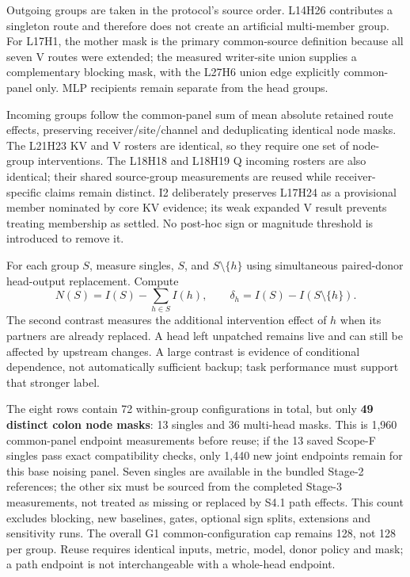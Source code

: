 \documentclass[11pt,a4paper]{article}
\begin{document}
Outgoing groups are taken in the protocol's source order. L14H26 contributes a singleton route and therefore does not create an artificial multi-member group. For L17H1, the mother mask is the primary common-source definition because all seven V routes were extended; the measured writer-site union supplies a complementary blocking mask, with the L27H6 union edge explicitly common-panel only. MLP recipients remain separate from the head groups.

Incoming groups follow the common-panel sum of mean absolute retained route effects, preserving receiver/site/channel and deduplicating identical node masks. The L21H23 KV and V rosters are identical, so they require one set of node-group interventions. The L18H18 and L18H19 Q incoming rosters are also identical; their shared source-group measurements are reused while receiver-specific claims remain distinct. I2 deliberately preserves L17H24 as a provisional member nominated by core KV evidence; its weak expanded V result prevents treating membership as settled. No post-hoc sign or magnitude threshold is introduced to remove it.

For each group $S$, measure singles, $S$, and $S\setminus\{h\}$ using simultaneous paired-donor head-output replacement. Compute
\[
 N(S)=I(S)-\sum_{h\in S}I(h),\qquad
 \delta_h=I(S)-I(S\setminus\{h\}).
\]
The second contrast measures the additional intervention effect of $h$ when its partners are already replaced. A head left unpatched remains live and can still be affected by upstream changes. A large contrast is evidence of conditional dependence, not automatically sufficient backup; task performance must support that stronger label.

The eight rows contain 72 within-group configurations in total, but only \textbf{49 distinct colon node masks}: 13 singles and 36 multi-head masks. This is 1,960 common-panel endpoint measurements before reuse; if the 13 saved Scope-F singles pass exact compatibility checks, only 1,440 new joint endpoints remain for this base noising panel. Seven singles are available in the bundled Stage-2 references; the other six must be sourced from the completed Stage-3 measurements, not treated as missing or replaced by S4.1 path effects. This count excludes blocking, new baselines, gates, optional sign splits, extensions and sensitivity runs. The overall G1 common-configuration cap remains 128, not 128 per group. Reuse requires identical inputs, metric, model, donor policy and mask; a path endpoint is not interchangeable with a whole-head endpoint.
\end{document}
